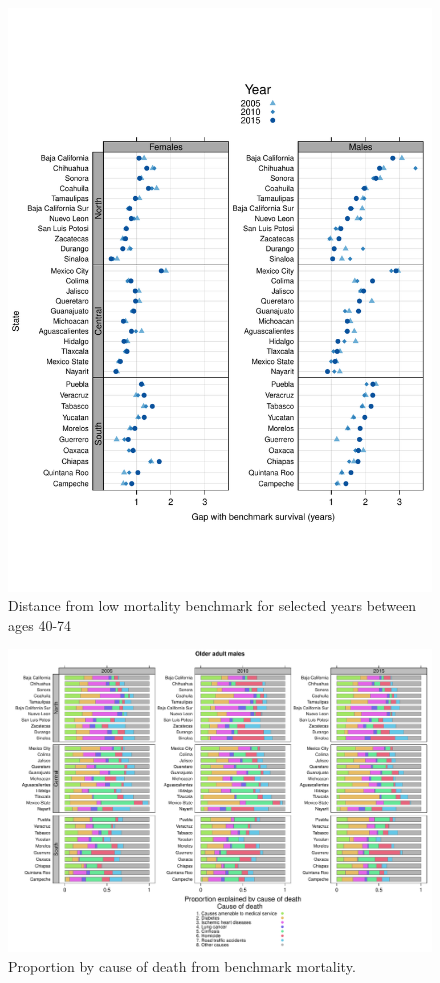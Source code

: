 \documentclass[11.5pt]{article}
\begin{document}
{\begin{figure}
\centering
\caption{Distance from low mortality benchmark for selected years between ages 40-74}
\begin{center}
\includegraphics[scale=.5]{Distance_oa.pdf}
\end{center}
\end{figure}

\begin{figure}
\centering
\caption{Proportion by cause of death from benchmark mortality.}
\begin{center}
\includegraphics[scale=.45]{Figure_prop_oaf.pdf}
\end{center}
\end{figure}


}
\end{document}
